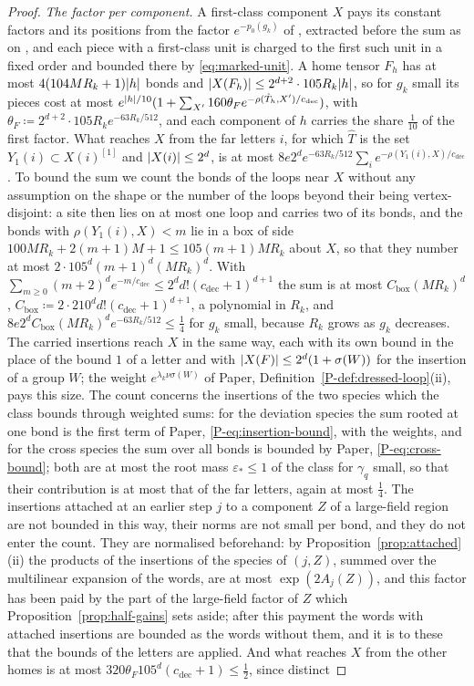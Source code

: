 \documentclass[11pt]{preprint}
\DeclarePairedDelimiter{\abs}{\lvert}{\rvert}
\numberwithin{equation}{section}
\theoremstyle{definition}
\theoremstyle{remark}
\theoremstyle{plain}
\begin{document}
\begin{proof}
\emph{The factor per component.} A first-class component $X$ pays its constant factors and its positions from the factor $e^{-p_0(g_k)}$ of \cite[(1.89)]{BalabanLFR2}, extracted before the sum as on \cite[p.~389, ll.~27--28]{BalabanLFR2}, and each piece with a first-class unit is charged to the first such unit in a fixed order and bounded there by \eqref{eq:marked-unit}. A home tensor $F_h$ has at most $4(104MR_k + 1)\abs h$ bonds and $\abs{X(F_h)} \leq 2^{d+2}\cdot105R_k\abs h$, so for $g_k$ small its pieces cost at most $e^{\abs h/10}(1 + \sum_{X'}160\theta_Fe^{-\rho(\hat T_h,X')/c_{\mathrm{dec}}})$, with $\theta_F \coloneqq 2^{d+2}\cdot105R_ke^{-63R_k/512}$, and each component of $h$ carries the share $\frac1{10}$ of the first factor. What reaches $X$ from the far letters $i$, for which $\hat T$ is the set $Y_1(i) \subset X(i)^{[1]}$ and $\abs{X(i)} \leq 2^d$, is at most $8e2^de^{-63R_k/512}\sum_ie^{-\rho(Y_1(i),X)/c_{\mathrm{dec}}}$. To bound the sum we count the bonds of the loops near $X$ without any assumption on the shape or the number of the loops beyond their being vertex-disjoint: a site then lies on at most one loop and carries two of its bonds, and the bonds with $\rho(Y_1(i), X) < m$ lie in a box of side $100MR_k + 2(m + 1)M + 1 \leq 105(m + 1)MR_k$ about $X$, so that they number at most $2\cdot105^d(m + 1)^d(MR_k)^d$. With $\sum_{m \geq 0}(m + 2)^de^{-m/c_{\mathrm{dec}}} \leq 2^dd!(c_{\mathrm{dec}} + 1)^{d+1}$ the sum is at most $C_{\mathrm{box}}(MR_k)^d$, $C_{\mathrm{box}} \coloneqq 2\cdot210^dd!(c_{\mathrm{dec}} + 1)^{d+1}$, a polynomial in $R_k$, and $8e2^dC_{\mathrm{box}}(MR_k)^de^{-63R_k/512} \leq \frac14$ for $g_k$ small, because $R_k$ grows as $g_k$ decreases. The carried insertions reach $X$ in the same way, each with its own bound in the place of the bound $1$ of a letter and with $\abs{X(F)} \leq 2^d(1 + \sigma(W))$ for the insertion of a group $W$; the weight $e^{\lambda_k\nu\sigma(W)}$ of Paper, Definition~\ref{P-def:dressed-loop}(ii), pays this size. The count concerns the insertions of the two species which the class bounds through weighted sums: for the deviation species the sum rooted at one bond is the first term of Paper, \eqref{P-eq:insertion-bound}, with the weights, and for the cross species the sum over all bonds is bounded by Paper, \eqref{P-eq:cross-bound}; both are at most the root mass $\varepsilon_* \leq 1$ of the class for $\gamma_q$ small, so that their contribution is at most that of the far letters, again at most $\frac14$. The insertions attached at an earlier step $j$ to a component $Z$ of a large-field region are not bounded in this way, their norms are not small per bond, and they do not enter the count. They are normalised beforehand: by Proposition~\ref{prop:attached}(ii) the products of the insertions of the species of $(j, Z)$, summed over the multilinear expansion of the words, are at most $\exp(2A_j(Z))$, and this factor has been paid by the part of the large-field factor of $Z$ which Proposition~\ref{prop:half-gains} sets aside; after this payment the words with attached insertions are bounded as the words without them, and it is to these that the bounds of the letters are applied. And what reaches $X$ from the other homes is at most $320\theta_F105^d(c_{\mathrm{dec}} + 1) \leq \frac12$, since distinct 
\end{proof}
\end{document}
